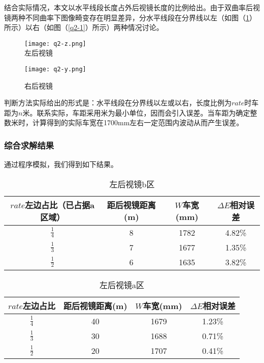 \documentclass[withoutpreface,bwprint]{cumcmthesis} %
\begin{document}
\par 结合实际情况，本文以水平线段长度占外后视镜长度的比例给出。由于双曲率后视镜两种不同曲率下图像畸变存在明显差异，分水平线段在分界线以左（如图（\ref{q2-2}）所示）以右（如图（\ref{q2-1}）所示）两种情况讨论。

\begin{figure}[!htbp]  
\begin{minipage}[t]{0.5\textwidth}
\centering  
\texttt{[image: q2-z.png]} \\
\caption{左后视镜} \label{q2-1}
\end{minipage}
\hspace{1ex}
\begin{minipage}[t]{0.5\textwidth}  
\centering  
\texttt{[image: q2-y.png]}\\
\caption{右后视镜}  \label{q2-2}
\end{minipage}  
\end{figure} 


\par 判断方法实际给出的形式是：水平线段在分界线以左或以右，长度比例为$rate$时车距为$n$米。联系实际，车距采用米为最小单位，因而会引入误差。当车距为确定整数米时，计算得到的实际车宽在1700mm左右一定范围内波动从而产生误差。

\subsubsection{综合求解结果}

通过程序模拟，我们得到如下结果。

\begin{table}[!htbp]
\centering
\caption{左后视镜b区}
\label{左后视镜b区}
\begin{tabular}{cccc}
\toprule
 $rate$左边占比（已占据a区域）  &  距后视镜距离(m) &  $W$车宽(mm) &  $\Delta E$相对误差  \\ \midrule
$\frac{1}{4}$ & 8 & 1782 & 4.82\% \\
$\frac{1}{3}$ & 7 & 1677 & 1.35\% \\
$\frac{1}{2}$ & 6 & 1635 & 3.82\% \\
\bottomrule 
\end{tabular}
\end{table}

\begin{table}[!htbp]
\centering
\caption{左后视镜a区}
\label{左后视镜a区}
\begin{tabular}{cccc}
\toprule
$rate$左边占比 & 距后视镜距离(m) & $W$车宽(mm) & $\Delta E$相对误差  \\ \midrule
$\frac{1}{4}$ & 40 & 1679 & 1.23\% \\
$\frac{1}{3}$ & 30 & 1688 & 0.71\% \\
$\frac{1}{2}$ & 20 & 1707 & 0.41\% \\
\bottomrule 
\end{tabular}
\end{table}
\end{document}

